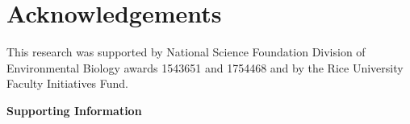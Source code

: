 \documentclass[12pt]{article}\usepackage[]{graphicx}\usepackage[dvipsnames]{xcolor}
\begin{document}
\section*{Acknowledgements}
This research was supported by National Science Foundation Division of Environmental Biology awards 1543651 and 1754468 and by the Rice University Faculty Initiatives Fund.



\newpage


\newpage
\clearpage 
\setcounter{equation}{0}
\setcounter{figure}{0}
\setcounter{section}{0}
\setcounter{table}{0}
\renewcommand{\theequation}{S.\arabic{equation}}
\renewcommand{\thetable}{S-\arabic{table}}
\renewcommand{\thefigure}{S-\arabic{figure}}
\renewcommand{\thesection}{S.\arabic{section}}

\centerline{\Large{\textbf{Supporting Information}}}
\end{document}
